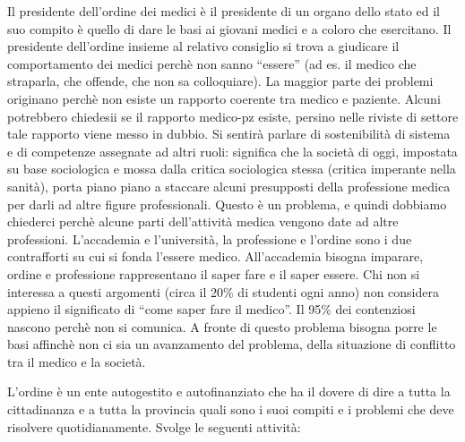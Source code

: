 Il presidente dell'ordine dei medici è il presidente di un organo dello
stato ed il suo compito è quello di dare le basi ai giovani medici e a
coloro che esercitano. Il presidente dell'ordine insieme al relativo
consiglio si trova a giudicare il comportamento dei medici perchè non
sanno ``essere'' (ad es. il medico che straparla, che offende, che non
sa colloquiare). La maggior parte dei problemi originano perchè non
esiste un rapporto coerente tra medico e paziente. Alcuni potrebbero
chiedesii se il rapporto medico-pz esiste, persino nelle riviste di
settore tale rapporto viene messo in dubbio. Si sentirà parlare di
sostenibilità di sistema e di competenze assegnate ad altri ruoli:
significa che la società di oggi, impostata su base sociologica e mossa
dalla critica sociologica stessa (critica imperante nella sanità), porta
piano piano a staccare alcuni presupposti della professione medica per
darli ad altre figure professionali. Questo è un problema, e quindi
dobbiamo chiederci perchè alcune parti dell'attività medica vengono date
ad altre professioni. L'accademia e l'università, la professione e
l'ordine sono i due contrafforti su cui si fonda l'essere medico.
All'accademia bisogna imparare, ordine e professione rappresentano il
saper fare e il saper essere. Chi non si interessa a questi argomenti
(circa il 20\% di studenti ogni anno) non considera appieno il
significato di ``come saper fare il medico''. Il 95\% dei contenziosi
nascono perchè non si comunica. A fronte di questo problema bisogna
porre le basi affinchè non ci sia un avanzamento del problema, della
situazione di conflitto tra il medico e la società.

L'ordine è un ente autogestito e autofinanziato che ha il dovere di dire
a tutta la cittadinanza e a tutta la provincia quali sono i suoi compiti
e i problemi che deve risolvere quotidianamente. Svolge le seguenti
attività:

